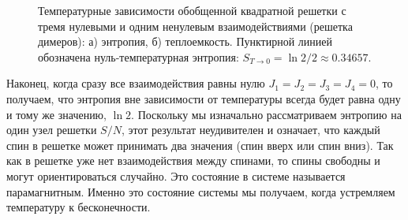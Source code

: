 \documentclass[utf8,12pt]{jetp}
\begin{document}
\begin{figure}[h]
	\begin{minipage}[h]{0.5\linewidth}
	\end{minipage}
	\hfill
	\begin{minipage}[h]{0.5\linewidth}
	\end{minipage}
	\caption{Температурные зависимости обобщенной квадратной решетки с тремя нулевыми и одним ненулевым взаимодействиями (решетка димеров): а) энтропия, б) теплоемкость. Пунктирной линией обозначена нуль-температурная энтропия: $S_{T\rightarrow 0} = \ln 2/2\approx 0.34657$.}
	\label{Dimers}
\end{figure}

Наконец, когда сразу все взаимодействия равны нулю $J_1 = J_2 = J_3 = J_4 = 0$, то получаем, что энтропия вне зависимости от температуры всегда будет равна одну и тому же значению, $\ln 2$. Поскольку мы изначально рассматриваем энтропию на один узел решетки $S/N$, этот результат неудивителен и означает, что каждый спин в решетке может принимать два значения (спин вверх или спин вниз). Так как в решетке уже нет взаимодействия между спинами, то спины свободны и могут ориентироваться случайно. Это состояние в системе называется парамагнитным. Именно это состояние системы мы получаем, когда устремляем температуру к бесконечности. 
\end{document}
